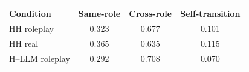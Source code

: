 \begin{tabular}{lccc}
\toprule
Condition & Same-role & Cross-role & Self-transition \\
\midrule
HH roleplay & 0.323 & 0.677 & 0.101 \\
HH real & 0.365 & 0.635 & 0.115 \\
H--LLM roleplay & 0.292 & 0.708 & 0.070 \\
\bottomrule
\end{tabular}

